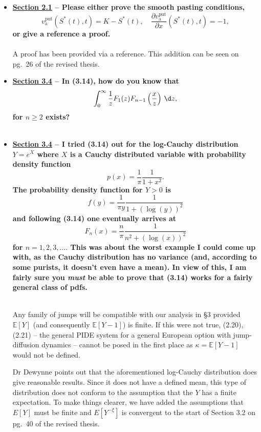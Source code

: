 \documentclass{article}
\begin{document}
\begin{enumerate}
\begin{itemize}
		\item \textbf{ \underline{Section 2.1} -- Please either prove the smooth pasting conditions,
			$$
				v_\text{a}^\text{put}(S^*(t),t) = K - S^*(t), \quad \frac{\partial v_\text{a}^\text{put}}{\partial x}(S^*(t),t) = -1,
			$$
			or give a reference a proof.\\ \\}
			A proof has been provided via a reference. This addition can be seen on pg.~26 of the revised thesis.
			
		\item \textbf{\underline{Section 3.4} -- In (3.14), how do you know that
			$$
				\int_0^\infty \frac{1}{z}F_1(z)F_{n-1}\left(\frac{x}{z}\right) \, \d z,
			$$
		for $n \geq 2$ exists? \\ \\}
		
		\item \textbf{\underline{Section 3.4} -- I tried (3.14) out for the log-Cauchy distribution $Y = e^X$ where $X$ is a Cauchy distributed variable with probability density function
		$$
			p(x) = \frac{1}{\pi}\frac{1}{1+x^2}.
		$$
		The probability density function for $Y > 0$ is
		$$
			f(y) = \frac{1}{\pi y}\frac{1}{1 + (\log(y))^2}
		$$
		and following (3.14) one eventually arrives at
		$$
			F_n(x) = \frac{n}{\pi} \frac{1}{n^2 + (\log(x))^2}
		$$
		for $n = 1,2,3, \ldots.$ This was about the worst example I could come up with, as the Cauchy distribution has no variance (and, according to some purists, it doesn't even have a mean). In view of this, I am fairly sure you \emph{must} be able to prove that (3.14) works for a fairly general class of pdfs.\\ \\}
		
		Any family of jumps will be compatible with our analysis in \S3 provided $\mathbb{E}[Y]$ (and consequently $\mathbb{E}[Y-1]$) is finite. If this were not true, (2.20), (2.21) -- the general PIDE system for a general European option with jump-diffusion dynamics -- cannot be posed in the first place as $\kappa = \mathbb{E}[Y-1]$ would not be defined. 
	
	Dr Dewynne points out that the aforementioned log-Cauchy distribution does give reasonable results. Since it does not have a defined mean, this type of distribution does not conform to the assumption that the $Y$ has a finite expectation. To make things clearer, we have added the assumptions that $E[Y]$ must be finite and $E[Y^{-\xi}]$ is convergent to the start of Section 3.2 on pg.~40 of the revised thesis.
	

\end{itemize}
\end{enumerate}
\end{document}

